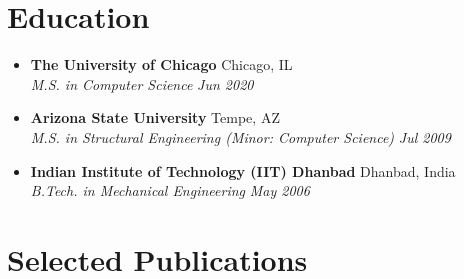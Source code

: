 \documentclass[10pt,letterpaper]{article}
\newcommand{\resumeSubHeadingListStart}{\begin{itemize}[leftmargin=0.15in, label={}]}
\newcommand{\resumeSubHeadingListEnd}{\end{itemize}}
\newcommand{\resumeSubheading}[4]{
  \item
    \textbf{\color{subheadingcolor}#1} \hfill {\color{datecolor}#2} \\
    \textit{\color{sectioncolor}#3} \hfill \textit{\color{datecolor}#4}
}
\begin{document}
\section*{Education}
\resumeSubHeadingListStart

\resumeSubheading
  {The University of Chicago}{Chicago, IL}
  {M.S. in Computer Science}{Jun 2020}

\resumeSubheading
  {Arizona State University}{Tempe, AZ}
  {M.S. in Structural Engineering (Minor: Computer Science)}{Jul 2009}

\resumeSubheading
  {Indian Institute of Technology (IIT) Dhanbad}{Dhanbad, India}
  {B.Tech. in Mechanical Engineering}{May 2006}

\resumeSubHeadingListEnd

\section*{Selected Publications}
\end{document}
